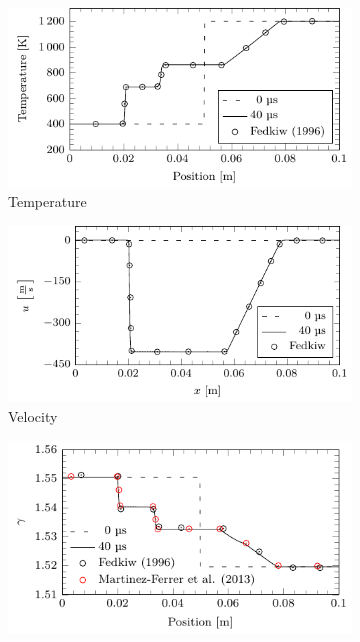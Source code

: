 \begin{figure}
    \begin{subfigure}[b]{0.5\textwidth}
        \centering
        \includegraphics[width=\textwidth]{figures/1D_inert_shocktube/T.pdf}
        \caption{Temperature}
    \end{subfigure}
    \begin{subfigure}[b]{0.5\textwidth}
        \centering
        \includegraphics[width=\textwidth]{figures/1D_inert_shocktube/u.pdf}
        \caption{Velocity}
    \end{subfigure}
    \begin{subfigure}[b]{0.5\textwidth}
        \centering
        \includegraphics[width=\textwidth]{figures/1D_inert_shocktube/gamma.pdf}

\end{subfigure}
\end{figure}
